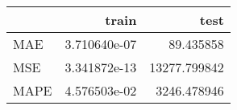 \begin{tabular}{lrr}
\toprule
{} &         train &          test \\
\midrule
MAE  &  3.710640e-07 &     89.435858 \\
MSE  &  3.341872e-13 &  13277.799842 \\
MAPE &  4.576503e-02 &   3246.478946 \\
\bottomrule
\end{tabular}
